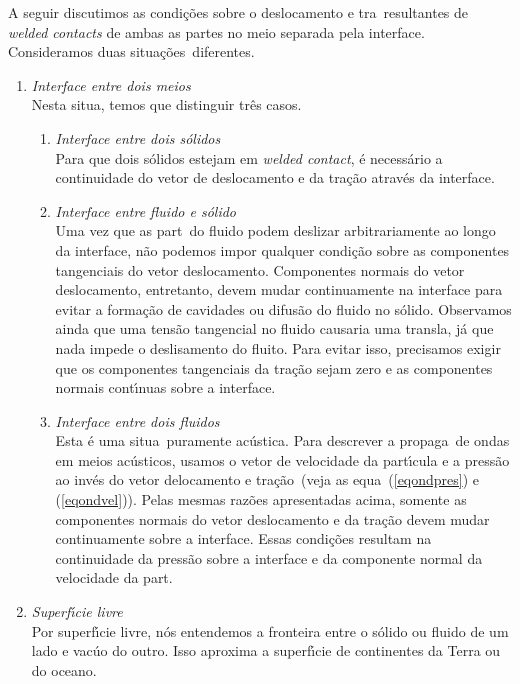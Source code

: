 A seguir discutimos as condi\c{c}\~oes sobre o deslocamento e tra\cao\
resultantes de {\em welded contacts} de ambas as partes no meio separada
pela interface. Consideramos duas situa\c{c}\~oes\ diferentes.
\begin{enumerate}
\item \emph{Interface entre dois meios} \\
Nesta situa\cao, temos que distinguir tr\^es casos.
\begin{enumerate}
\item \emph{Interface entre dois s\'olidos} \\
Para que dois s\'olidos estejam em {\em welded contact}, \'e
necess\'ario a continuidade do vetor de deslocamento e da tra\c{c}\~ao
atrav\'es da interface.
\item \emph{Interface entre fluido e s\'olido} \\
Uma vez que as part\iculas\ do fluido podem deslizar arbitrariamente ao
longo da interface, n\~ao podemos impor qualquer condi\c{c}\~ao sobre as
componentes tangenciais do vetor deslocamento. Componentes normais do
vetor deslocamento, entretanto, devem mudar continuamente na interface
para evitar a forma\c{c}\~ao de cavidades ou difus\~ao do fluido no
s\'olido. Observamos ainda que uma tens\~ao tangencial no fluido
causaria uma transla\cao, j\'a que nada impede o deslisamento do fluito.
Para evitar isso, precisamos exigir que os componentes tangenciais da
tra\c{c}\~ao sejam zero e as componentes normais cont\'\i nuas sobre a
interface.
\item \emph{Interface entre dois fluidos} \\
Esta \'e uma situa\cao\ puramente ac\'ustica. Para descrever a
propaga\cao\ de ondas em meios ac\'usticos, usamos o vetor de velocidade
da part\'\i cula e a press\~ao ao inv\'es do vetor delocamento e
tra\c{c}\~ao\ (veja as equa\coes\ (\ref{eqondpres}) e (\ref{eqondvel})).
Pelas mesmas raz\~oes apresentadas acima, somente as componentes normais
do vetor deslocamento e da tra\c{c}\~ao devem mudar continuamente sobre
a interface. Essas condi\c{c}\~oes resultam na continuidade da press\~ao
sobre a interface e da componente normal da velocidade da part\icula.
\end{enumerate}
\item \emph{Superf\'\i cie livre} \\
Por superf\'\i cie livre, n\'os entendemos a fronteira entre o s\'olido
ou fluido de um lado e vac\'uo do outro. Isso aproxima a superf\'\i cie
de continentes da Terra ou do oceano.
\begin{enumerate}

\end{enumerate}
\end{enumerate}
